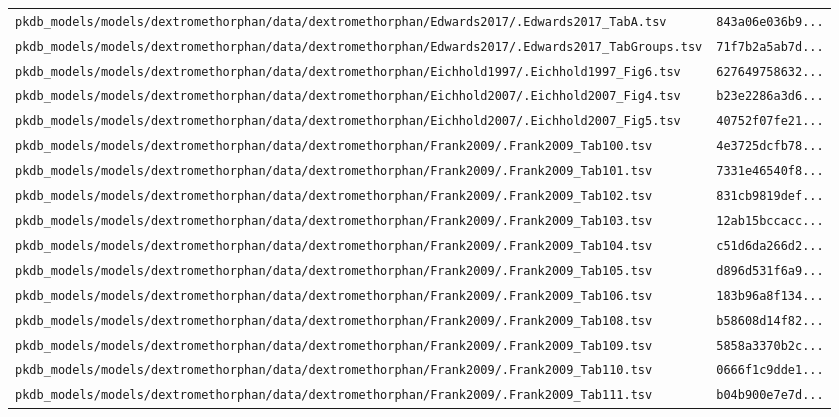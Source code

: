\begin{longtable}{ll}
\texttt{pkdb\_models/models/dextromethorphan/data/dextromethorphan/Edwards2017/.Edwards2017\_TabA.tsv} & \texttt{843a06e036b9...} \\
\texttt{pkdb\_models/models/dextromethorphan/data/dextromethorphan/Edwards2017/.Edwards2017\_TabGroups.tsv} & \texttt{71f7b2a5ab7d...} \\
\texttt{pkdb\_models/models/dextromethorphan/data/dextromethorphan/Eichhold1997/.Eichhold1997\_Fig6.tsv} & \texttt{627649758632...} \\
\texttt{pkdb\_models/models/dextromethorphan/data/dextromethorphan/Eichhold2007/.Eichhold2007\_Fig4.tsv} & \texttt{b23e2286a3d6...} \\
\texttt{pkdb\_models/models/dextromethorphan/data/dextromethorphan/Eichhold2007/.Eichhold2007\_Fig5.tsv} & \texttt{40752f07fe21...} \\
\texttt{pkdb\_models/models/dextromethorphan/data/dextromethorphan/Frank2009/.Frank2009\_Tab100.tsv} & \texttt{4e3725dcfb78...} \\
\texttt{pkdb\_models/models/dextromethorphan/data/dextromethorphan/Frank2009/.Frank2009\_Tab101.tsv} & \texttt{7331e46540f8...} \\
\texttt{pkdb\_models/models/dextromethorphan/data/dextromethorphan/Frank2009/.Frank2009\_Tab102.tsv} & \texttt{831cb9819def...} \\
\texttt{pkdb\_models/models/dextromethorphan/data/dextromethorphan/Frank2009/.Frank2009\_Tab103.tsv} & \texttt{12ab15bccacc...} \\
\texttt{pkdb\_models/models/dextromethorphan/data/dextromethorphan/Frank2009/.Frank2009\_Tab104.tsv} & \texttt{c51d6da266d2...} \\
\texttt{pkdb\_models/models/dextromethorphan/data/dextromethorphan/Frank2009/.Frank2009\_Tab105.tsv} & \texttt{d896d531f6a9...} \\
\texttt{pkdb\_models/models/dextromethorphan/data/dextromethorphan/Frank2009/.Frank2009\_Tab106.tsv} & \texttt{183b96a8f134...} \\
\texttt{pkdb\_models/models/dextromethorphan/data/dextromethorphan/Frank2009/.Frank2009\_Tab108.tsv} & \texttt{b58608d14f82...} \\
\texttt{pkdb\_models/models/dextromethorphan/data/dextromethorphan/Frank2009/.Frank2009\_Tab109.tsv} & \texttt{5858a3370b2c...} \\
\texttt{pkdb\_models/models/dextromethorphan/data/dextromethorphan/Frank2009/.Frank2009\_Tab110.tsv} & \texttt{0666f1c9dde1...} \\
\texttt{pkdb\_models/models/dextromethorphan/data/dextromethorphan/Frank2009/.Frank2009\_Tab111.tsv} & \texttt{b04b900e7e7d...} \\

\end{longtable}
